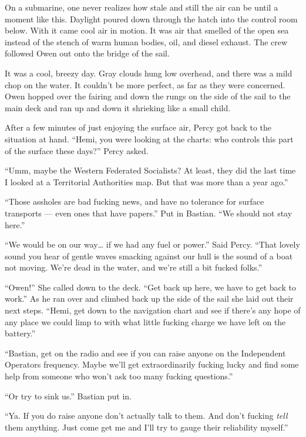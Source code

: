 \documentclass[
]{scrbook}
\begin{document}
On a submarine, one never realizes how stale and still the air can be
until a moment like this. Daylight poured down through the hatch into
the control room below. With it came cool air in motion. It was air that
smelled of the open sea instead of the stench of warm human bodies, oil,
and diesel exhaust. The crew followed Owen out onto the bridge of the
sail.

It was a cool, breezy day. Gray clouds hung low overhead, and there was
a mild chop on the water. It couldn't be more perfect, as far as they
were concerned. Owen hopped over the fairing and down the rungs on the
side of the sail to the main deck and ran up and down it shrieking like
a small child.

After a few minutes of just enjoying the surface air, Percy got back to
the situation at hand. ``Hemi, you were looking at the charts: who
controls this part of the surface these days?'' Percy asked.

``Umm, maybe the Western Federated Socialists? At least, they did the
last time I looked at a Territorial Authorities map. But that was more
than a year ago.''

``Those assholes are bad fucking news, and have no tolerance for surface
transports --- even ones that have papers.'' Put in Bastian. ``We should
not stay here.''

``We would be on our way\ldots{} if we had any fuel or power.'' Said
Percy. ``That lovely sound you hear of gentle waves smacking against our
hull is the sound of a boat not moving. We're dead in the water, and
we're still a bit fucked folks.''

``Owen!'' She called down to the deck. ``Get back up here, we have to
get back to work.'' As he ran over and climbed back up the side of the
sail she laid out their next steps. ``Hemi, get down to the navigation
chart and see if there's any hope of any place we could limp to with
what little fucking charge we have left on the battery.''

``Bastian, get on the radio and see if you can raise anyone on the
Independent Operators frequency. Maybe we'll get extraordinarily fucking
lucky and find some help from someone who won't ask too many fucking
questions.''

``Or try to sink us.'' Bastian put in.

``Ya. If you do raise anyone don't actually talk to them. And don't
fucking \emph{tell} them anything. Just come get me and I'll try to
gauge their reliability myself.''
\end{document}
